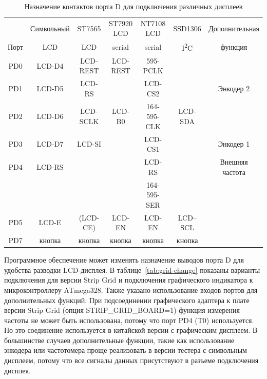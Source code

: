 \begin{table}[H]
  \begin{center}
    \begin{tabular}{| c || c | c | c | c | c | c |}
    \hline
           & Символьный    & ST7565     & ST7920 LCD     & NT7108 LCD  & SSD1306     & Дополнительная \\
     Порт  & LCD           &   LCD      & serial         & serial      & I\textsuperscript{2}C  & функция \\
    \hline
    \hline
    PD0    &  LCD-D4       &  LCD-REST  & LCD-REST       & 595-PCLK        &            & \\
    \hline
    PD1    &  LCD-D5       &  LCD-RS    &                & LCD-CS2     &             & Энкодер 2 \\
    \hline
    PD2    &  LCD-D6       &  LCD-SCLK  & LCD-B0         & 164-595-CLK &  LCD-SDA    & \\
    \hline
    PD3    &  LCD-D7       &  LCD-SI    &                & LCD-CS1     &             & Энкодер 1 \\
    \hline
    PD4    &  LCD-RS       &            &                & LCD-RS      &             & Внешняя частота \\
           &               &            &                & 164-595-SER &             &                \\
    \hline
    PD5    &  LCD-E        &  (LCD-CE)  & LCD-EN         & LCD-EN      &   LCD--SCL  & \\
    \hline
    PD7    &  кнопка       & кнопка     & кнопка         & кнопка      & кнопка      & \\
    \hline
    \end{tabular}
  \end{center}
  \caption{Назначение контактов порта D для подключения различных дисплеев}
  \label{tab:display-con}
\end{table}

Программное обеспечение может изменять назначение выводов порта D для удобства разводки LCD-дисплея. 
В таблице~\ref{tab:grid-change} показаны варианты подключения для версии Strip Grid и подключения графического 
индикатора к микроконтроллеру ATmega328.
Также указано использование входов портов для дополнительных функций.
При подсоединении графического адаптера к плате версии Strip Grid (опция STRIP\_GRID\_BOARD=1)
функция измерения частоты не может быть использована, потому что порт PD4 (T0) используется.
Но это соединение используется в китайской версии с графическим дисплеем.
В большинстве случаев дополнительные функции, такие как использование энкодера или частотомера проще 
реализовать в версии тестера с символьным дисплеем, потому что все сигналы данных присутствуют в разъеме
подключения дисплея.


